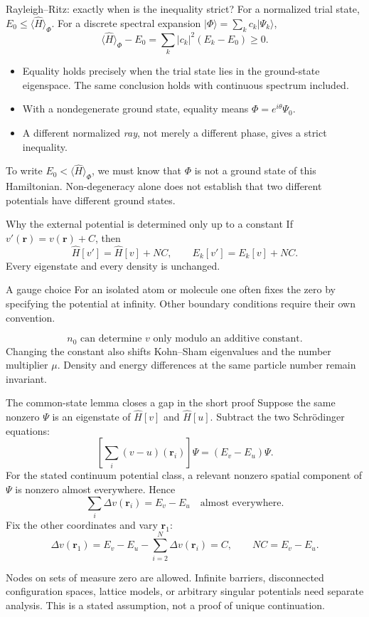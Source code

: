 \documentclass[aspectratio=169,10pt]{beamer}
\newcommand{\warnbox}[1]{\begin{tcolorbox}[colback=palewarm,colframe=warm,title={A trap to avoid}]#1\end{tcolorbox}}
\newcommand{\dftbox}[1]{\begin{tcolorbox}[colback=paleteal,colframe=teal,title={Key result}]#1\end{tcolorbox}}
\newcommand{\rr}{\mathbf r}
\newcommand{\ket}[1]{\lvert #1\rangle}
\newcommand{\avg}[1]{\langle #1\rangle}
\begin{document}
\begin{frame}{Rayleigh--Ritz: exactly when is the inequality strict?}
For a normalized trial state, $E_0\leq\avg{\hat H}_\Phi$.
For a discrete spectral expansion $\ket\Phi=\sum_k c_k\ket{\Psi_k}$,
\[
 \avg{\hat H}_\Phi-E_0=\sum_k|c_k|^2(E_k-E_0)\geq0.
\]
\begin{itemize}
\item Equality holds precisely when the trial state lies in the ground-state
eigenspace. The same conclusion holds with continuous spectrum included.
\item With a nondegenerate ground state, equality means
$\Phi=e^{i\theta}\Psi_0$.
\item A different normalized \emph{ray}, not merely a different phase, gives
a strict inequality.
\end{itemize}
\dftbox{To write $E_0<\avg{\hat H}_\Phi$, we must know that $\Phi$ is not
a ground state of this Hamiltonian. Non-degeneracy alone does not establish
that two different potentials have different ground states.}
\end{frame}

\begin{frame}{Why the external potential is determined only up to a constant}
If $v'(\rr)=v(\rr)+C$, then
\[
 \hat H[v']=\hat H[v]+NC,\qquad E_k[v']=E_k[v]+NC.
\]
Every eigenstate and every density is unchanged.
\begin{block}{A gauge choice}
For an isolated atom or molecule one often fixes the zero by specifying the
potential at infinity. Other boundary conditions require their own convention.
\end{block}
\[
 \boxed{n_0\text{ can determine }v\text{ only modulo an additive constant}.}
\]
Changing the constant also shifts Kohn--Sham eigenvalues and the number
multiplier $\mu$. Density and energy differences at the same particle number
remain invariant.
\end{frame}

\begin{frame}{The common-state lemma closes a gap in the short proof}
\small
Suppose the same nonzero $\Psi$ is an eigenstate of $\hat H[v]$ and $\hat H[u]$.
Subtract the two Schr\"odinger equations:
\[
 \left[\sum_i(v-u)(\rr_i)\right]\Psi=(E_v-E_u)\Psi.
\]
For the stated continuum potential class, a relevant nonzero spatial component
of $\Psi$ is nonzero almost everywhere. Hence
\[
 \sum_i\Delta v(\rr_i)=E_v-E_u\quad\text{almost everywhere}.
\]
Fix the other coordinates and vary $\rr_1$:
\[
 \Delta v(\rr_1)=E_v-E_u-\sum_{i=2}^N\Delta v(\rr_i)=C,
 \qquad NC=E_v-E_u.
\]
\warnbox{Nodes on sets of measure zero are allowed. Infinite barriers,
disconnected configuration spaces, lattice models, or arbitrary singular
potentials need separate analysis. This is a stated assumption, not a proof
of unique continuation.}
\end{frame}
\end{document}
